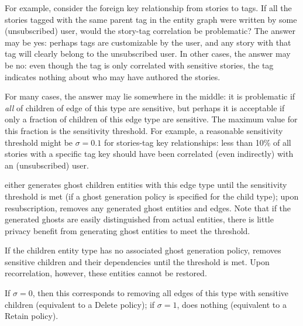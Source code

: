         For example, consider the foreign key relationship from stories to tags. If all
        the stories tagged with the same parent tag in the entity graph were written by some
        (unsubscribed) user, would the story-tag correlation be problematic? The answer may be yes: 
        perhaps tags are customizable by the user, and any story with that tag will clearly
        belong to the unsubscribed user. In other cases, the answer may be no: even though the tag is only
        correlated with sensitive stories, the tag indicates nothing about who may have authored the stories.

        For many cases, the answer may lie somewhere in the middle: it is problematic if \emph{all} of
        children of edge of this type are sensitive, but perhaps it is acceptable if only a fraction of
        children of this edge type are sensitive. The maximum value for this fraction is the sensitivity threshold.
        For example, a reasonable sensitivity threshold might be $\sigma = 0.1$ for stories-tag key relationships:
        less than 10\% of all stories with a specific tag key should have been correlated (even
        indirectly) with an (unsubscribed) user. 

        \sys either generates ghost children entities with this edge type until the
        sensitivity threshold is met (if a ghost generation policy is specified for the child type); upon
        resubscription, \sys removes any generated ghost entities and edges.
        Note that if the generated ghosts are easily distinguished from actual entities, there is
        little privacy benefit from generating ghost entities to meet the threshold.

        If the children entity type has no associated ghost generation policy, \sys removes
        sensitive children and their dependencies until the threshold is met.  Upon recorrelation,
        however, these entities cannot be restored.

        If $\sigma = 0$, then this corresponds to removing all edges of this type
        with sensitive children (equivalent to a Delete policy); if $\sigma = 1$, \sys does
        nothing (equivalent to a Retain policy).

